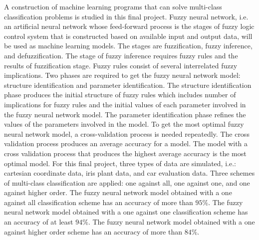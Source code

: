 \begin{Abstract}
A construction of machine learning programs that can solve multi-class classification problems is studied in this final project. Fuzzy neural network, i.e. an artificial neural network whose feed-forward process is the stages of fuzzy logic control system that is constructed based on available input and output data, will be used as machine learning models. The stages are fuzzification, fuzzy inference, and defuzzification. The stage of fuzzy inference requires fuzzy rules and the results of fuzzification stage. Fuzzy rules consist of several interrelated fuzzy implications. Two phases are required to get the fuzzy neural network model: structure identification and parameter identification. The structure identification phase produces the initial structure of fuzzy rules which includes number of implications for fuzzy rules and the initial values of each parameter involved in the fuzzy neural network model. The parameter identification phase refines the values of the parameters involved in the model. To get the most optimal fuzzy neural network model, a cross-validation process is needed repeatedly. The cross validation process produces an average accuracy for a model. The model with a cross validation process that produces the highest average accuracy is the most optimal model. For this final project, three types of data are simulated, i.e.: cartesian coordinate data, iris plant data, and car evaluation data. Three schemes of multi-class classification are applied: one against all, one against one, and one against higher order. The fuzzy neural network model obtained with a one against all classification scheme has an accuracy of more than $95\%$. The fuzzy neural network model obtained with a one against one classification scheme has an accuracy of at least $94\%$. The fuzzy neural network model obtained with a one against higher order scheme has an accuracy of more than $84\%$.


\end{Abstract}



